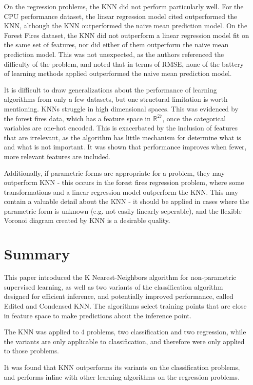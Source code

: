 \documentclass{amsart}
\begin{document}
    On the regression problems, the KNN did not perform particularly well. For the
    CPU performance dataset, the linear regression model cited\cite{cpu_dataset}
    outperformed the KNN, although the KNN outperformed the naive mean prediction model.
    On the Forest Fires dataset\cite{ff_dataset}, the KNN did not outperform a linear regression
    model fit on the same set of features, nor did either of them outperform the
    naive mean prediction model. This was not unexpected, as the authors referenced the
    difficulty of the problem, and noted that in terms of RMSE, none of the battery of
    learning methods applied outperformed the naive mean prediction model.

    It is difficult to draw generalizations about the performance of learning
    algorithms from only a few datasets, but one structural limitation is worth
    mentioning. KNNs struggle in high dimensional spaces. This was evidenced by the forest fires
    data, which has a feature space in $\mathbb{R}^{27}$, once the categorical
    variables are one-hot encoded. This is exacerbated by the inclusion of features that
    are irrelevant, as the algorithm has little mechanism for determine
    what is and what is not important. It was shown that performance improves
    when fewer, more relevant features are included.

    Additionally, if parametric forms are appropriate for a problem, they may outperform
    KNN - this occurs in the forest fires regression problem, where some transformations
    and a linear regression model outperform the KNN. This may contain a valuable
    detail about the KNN - it should be applied in cases where the parametric form is unknown (e.g.
    not easily linearly seperable), and the flexible Voronoi diagram created by KNN is a desirable quality.

    \section{Summary}
    This paper introduced the K Nearest-Neighbors algorithm for non-parametric supervised learning,
    as well as two variants of the classification algorithm designed for efficient inference, and
    potentially improved performance, called Edited and Condensed KNN. The algorithms select
    training points that are close in feature space to make predictions about the inference point.

    The KNN was applied to 4 problems, two classification and two regression, while the variants
    are only applicable to classification, and therefore were only applied to those problems.

    It was found that KNN outperforms its variants on the classification problems, and performs inline
    with other learning algorithms on the regression problems.




\end{document}
